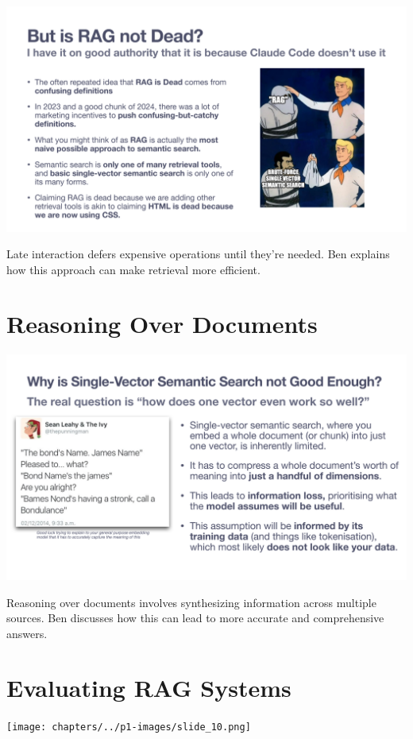 \documentclass[
  letterpaper,
  oneside]{scrbook}
\begin{document}
\includegraphics{chapters/../p1-images/slide_8.png}

Late interaction defers expensive operations until they're needed. Ben
explains how this approach can make retrieval more efficient.

\section{Reasoning Over Documents}\label{reasoning-over-documents}

\includegraphics{chapters/../p1-images/slide_9.png}

Reasoning over documents involves synthesizing information across
multiple sources. Ben discusses how this can lead to more accurate and
comprehensive answers.

\section{Evaluating RAG Systems}\label{evaluating-rag-systems}

\texttt{[image: chapters/../p1-images/slide\_10.png]}
\end{document}
